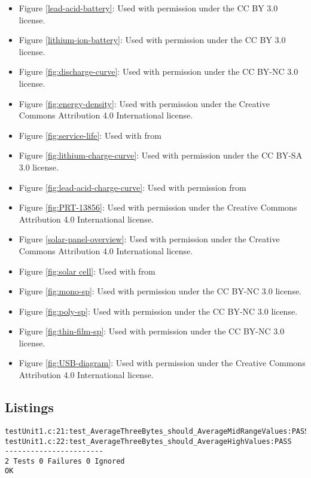 \begin{itemize}
\item Figure \ref{lead-acid-battery}: Used with permission under the CC BY 3.0 license. \cite{Lead-Acid-Charging}
\item Figure \ref{lithium-ion-battery}: Used with permission under the CC BY 3.0 license. \cite{lithium-ion-battery}
\item Figure \ref{fig:discharge-curve}: Used with permission under the CC BY-NC 3.0 license. \cite{discharge-curve}
\item Figure \ref{fig:energy-density}: Used with permission under the Creative Commons Attribution 4.0 International license. \cite{energy-density}
\item Figure \ref{fig:service-life}: Used with from
\item Figure \ref{fig:lithium-charge-curve}: Used with permission under the CC BY-SA 3.0 license. \cite{lithium-charge-curve}
\item Figure \ref{fig:lead-acid-charge-curve}: Used with permission from
\item Figure \ref{fig:PRT-13856}: Used with permission under the Creative Commons Attribution 4.0 International license. \cite{PRT-13856}
\item Figure \ref{solar-panel-overview}: Used with permission under the Creative Commons Attribution 4.0 International license. \cite{solar-panel-overview}
\item Figure \ref{fig:solar cell}: Used with from
\item Figure \ref{fig:mono-sp}: Used with permission under the CC BY-NC 3.0 license. \cite{mono-sp}
\item Figure \ref{fig:poly-sp}: Used with permission under the CC BY-NC 3.0 license. \cite{poly-sp}
\item Figure \ref{fig:thin-film-sp}: Used with permission under the CC BY-NC 3.0 license. \cite{thin-film-sp}
\item Figure \ref{fig:USB-diagram}: Used with permission under the Creative Commons Attribution 4.0 International license. \cite{USB-diagram}

\end{itemize}

\newpage
\subsection{Listings}
\renewcommand{\lstlistlistingname}{}
\lstlistoflistings
\hfill

\begin{lstlisting}[label={lst:unity-report}, caption=Example Unity Test Report Output \cite{unity-homepage}]
testUnit1.c:21:test_AverageThreeBytes_should_AverageMidRangeValues:PASS
testUnit1.c:22:test_AverageThreeBytes_should_AverageHighValues:PASS
-----------------------
2 Tests 0 Failures 0 Ignored
OK
\end{lstlisting}

